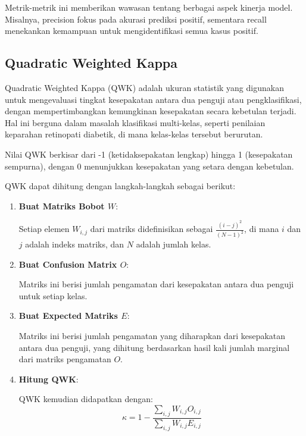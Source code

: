 Metrik-metrik ini memberikan wawasan tentang berbagai aspek kinerja model. Misalnya, precision fokus pada akurasi prediksi positif, sementara recall menekankan kemampuan untuk mengidentifikasi semua kasus positif.

\subsection{Quadratic Weighted Kappa}

Quadratic Weighted Kappa (QWK) adalah ukuran statistik yang digunakan untuk mengevaluasi tingkat kesepakatan antara dua penguji atau pengklasifikasi, dengan mempertimbangkan kemungkinan kesepakatan secara kebetulan terjadi. Hal ini berguna dalam masalah klasifikasi multi-kelas, seperti penilaian keparahan retinopati diabetik, di mana kelas-kelas tersebut berurutan.

Nilai QWK berkisar dari -1 (ketidaksepakatan lengkap) hingga 1 (kesepakatan sempurna), dengan 0 menunjukkan kesepakatan yang setara dengan kebetulan.

QWK dapat dihitung dengan langkah-langkah sebagai berikut:

\begin{enumerate}
    \item \textbf{Buat Matriks Bobot \(W\)}:
    
    Setiap elemen \(W_{i,j}\) dari matriks didefinisikan sebagai \(\frac{(i - j)^2}{(N - 1)^2}\), di mana \(i\) dan \(j\) adalah indeks matriks, dan \(N\) adalah jumlah kelas.
    
    \item \textbf{Buat Confusion Matrix \(O\)}:
    
    Matriks ini berisi jumlah pengamatan dari kesepakatan antara dua penguji untuk setiap kelas.
    
    \item \textbf{Buat Expected Matriks \(E\)}:
     
    Matriks ini berisi jumlah pengamatan yang diharapkan dari kesepakatan antara dua penguji, yang dihitung berdasarkan hasil kali jumlah marginal dari matriks pengamatan \(O\).
    
    \item \textbf{Hitung QWK}:
    
    QWK kemudian didapatkan dengan:
    \begin{equation}
        \label{eq:rumusQWK}
    \kappa = 1 - \frac{\sum_{i,j} W_{i,j} O_{i,j}}{\sum_{i,j} W_{i,j} E_{i,j}}
    \end{equation}
\end{enumerate}

